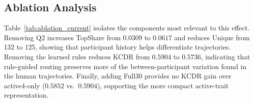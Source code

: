 \subsection{Ablation Analysis}
\label{sec:ablation_analysis}

Table~\ref{tab:ablation_current} isolates the components most relevant to this
effect. Removing Q2 increases TopShare from \(0.0309\) to \(0.0617\) and
reduces Unique from 132 to 125, showing that participant history helps
differentiate trajectories. Removing the learned rules reduces KCDR from
\(0.5904\) to \(0.5736\), indicating that rule-guided routing preserves more
of the between-participant variation found in the human trajectories.
Finally, adding Full30 provides no KCDR gain over active4-only
(\(0.5852\) vs.\ \(0.5904\)), supporting the more compact active-trait
representation.

\begin{table}[t]
\centering
\scriptsize
\setlength{\tabcolsep}{3pt}
\caption{Complete GPT-4o ablation results on 162 participants.}
\label{tab:ablation_current}
\end{table}

